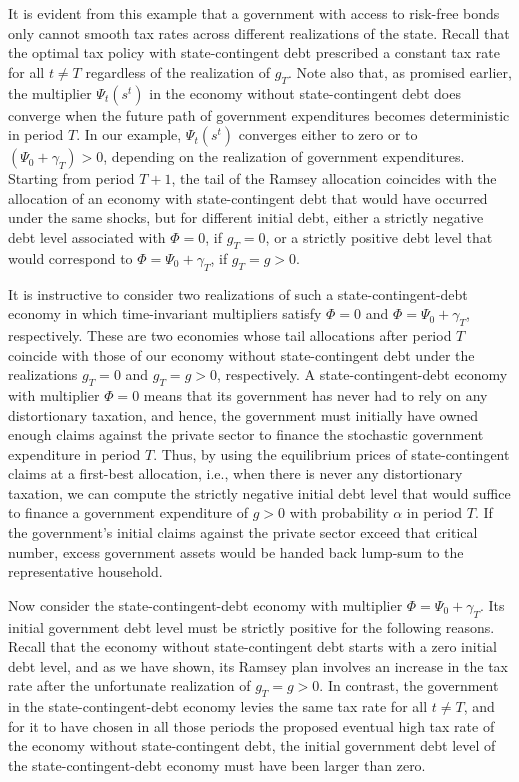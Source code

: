 It is evident from this example that a government with access
to risk-free bonds only cannot smooth tax rates across  different
realizations of the state. Recall that the optimal tax policy with
state-contingent debt prescribed a constant tax rate for all
$t\not=T$ regardless of the realization of $g_T$. Note also that,
as promised earlier, the multiplier $\Psi_t(s^t)$ in the economy
without state-contingent debt does converge when the future path
of government expenditures becomes deterministic in period $T$. In
our example, $\Psi_t(s^t)$ converges  either to zero or to
$(\Psi_0+\gamma_T)>0$, depending on the realization of government
expenditures. Starting from period $T+1$, the  tail of the Ramsey
allocation coincides  with the allocation of an economy with
state-contingent debt that would have occurred under the same
shocks, but for different initial debt, either a strictly
negative debt level associated with $\Phi=0$, if $g_T=0$, or a
strictly positive debt level that would correspond to
$\Phi = \Psi_0+\gamma_T$, if $g_T=g>0$.

It is instructive to consider two realizations of such a  state-contingent-debt
economy   in which  time-invariant multipliers satisfy  $\Phi=0$ and
$\Phi = \Psi_0+\gamma_T$, respectively.  These are  two economies whose tail allocations
after period $T$ coincide with those of our economy without
state-contingent debt under the realizations $g_T=0$ and $g_T=g>0$,
respectively. A state-contingent-debt economy with multiplier $\Phi=0$
means that its government has never had to rely on any
distortionary taxation, and hence, the government must initially
have owned enough claims against the private sector to finance
the stochastic government expenditure in period $T$. Thus, by using
the equilibrium prices of state-contingent claims at a first-best
allocation, i.e., when there is never any distortionary taxation,
we can compute the strictly negative initial debt level that would
suffice to finance a government expenditure of $g>0$ with
probability $\alpha$ in period $T$. If the government's initial
claims against the private sector exceed that critical number,
 excess government assets would be handed back lump-sum to
the representative household.

Now consider the state-contingent-debt economy with multiplier
$\Phi = \Psi_0+\gamma_T$. Its initial government debt level must
be strictly positive for the following reasons. Recall that the
economy without state-contingent debt starts with a zero initial
debt level, and as we have shown, its Ramsey plan involves an increase
in the tax rate after the unfortunate realization of $g_T=g>0$.
In contrast, the government in the state-contingent-debt economy
levies the same tax rate for all $t\not=T$, and for it to have
chosen in all those periods the proposed  eventual high tax rate of
the economy without state-contingent debt, the initial government
debt level of the state-contingent-debt economy must have been
larger than zero.

